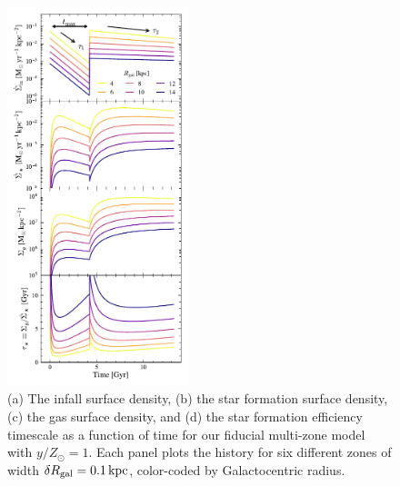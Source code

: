\documentclass[twocolumn,twocolappendix,linenumbers]{aastex631}
\newcommand{\kpc}{\,{\rm kpc}}
\newcommand{\onecolumn}{0.47\textwidth}
\begin{document}
\begin{figure}
    \centering
    \includegraphics[width=\onecolumn]{figures/star_formation_history.pdf}
    \caption{(a) The infall surface density, (b) the star formation surface density, (c) the gas surface density, and (d) the star formation efficiency timescale as a function of time for our fiducial multi-zone model with $y/Z_\odot=1$. Each panel plots the history for six different zones of width $\delta R_{\rm gal}=0.1\kpc$, color-coded by Galactocentric radius.}
    \label{fig:sfh}
\end{figure}
\end{document}
